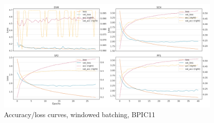 \begin{figure}[!htb]
    \centering
    \includegraphics[width=\textwidth]{gfx/bpic2011/windowed_loss_acc_curve.png}
    \caption{Accuracy/loss curves, windowed batching, BPIC11}
\end{figure}
\FloatBarrier

